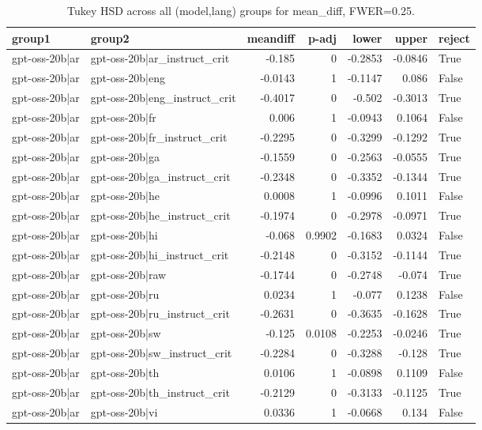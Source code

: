 \begin{table}
\caption{Tukey HSD across all (model,lang) groups for mean_diff, FWER=0.25.}
\label{tab:tukey_all_models_all_langs_mean_diff}
\begin{tabular}{l l r r r r l}
\toprule
group1 & group2 & meandiff & p-adj & lower & upper & reject \\
\midrule
gpt-oss-20b|ar & gpt-oss-20b|ar_instruct_crit & -0.185 & 0 & -0.2853 & -0.0846 & True \\
gpt-oss-20b|ar & gpt-oss-20b|eng & -0.0143 & 1 & -0.1147 & 0.086 & False \\
gpt-oss-20b|ar & gpt-oss-20b|eng_instruct_crit & -0.4017 & 0 & -0.502 & -0.3013 & True \\
gpt-oss-20b|ar & gpt-oss-20b|fr & 0.006 & 1 & -0.0943 & 0.1064 & False \\
gpt-oss-20b|ar & gpt-oss-20b|fr_instruct_crit & -0.2295 & 0 & -0.3299 & -0.1292 & True \\
gpt-oss-20b|ar & gpt-oss-20b|ga & -0.1559 & 0 & -0.2563 & -0.0555 & True \\
gpt-oss-20b|ar & gpt-oss-20b|ga_instruct_crit & -0.2348 & 0 & -0.3352 & -0.1344 & True \\
gpt-oss-20b|ar & gpt-oss-20b|he & 0.0008 & 1 & -0.0996 & 0.1011 & False \\
gpt-oss-20b|ar & gpt-oss-20b|he_instruct_crit & -0.1974 & 0 & -0.2978 & -0.0971 & True \\
gpt-oss-20b|ar & gpt-oss-20b|hi & -0.068 & 0.9902 & -0.1683 & 0.0324 & False \\
gpt-oss-20b|ar & gpt-oss-20b|hi_instruct_crit & -0.2148 & 0 & -0.3152 & -0.1144 & True \\
gpt-oss-20b|ar & gpt-oss-20b|raw & -0.1744 & 0 & -0.2748 & -0.074 & True \\
gpt-oss-20b|ar & gpt-oss-20b|ru & 0.0234 & 1 & -0.077 & 0.1238 & False \\
gpt-oss-20b|ar & gpt-oss-20b|ru_instruct_crit & -0.2631 & 0 & -0.3635 & -0.1628 & True \\
gpt-oss-20b|ar & gpt-oss-20b|sw & -0.125 & 0.0108 & -0.2253 & -0.0246 & True \\
gpt-oss-20b|ar & gpt-oss-20b|sw_instruct_crit & -0.2284 & 0 & -0.3288 & -0.128 & True \\
gpt-oss-20b|ar & gpt-oss-20b|th & 0.0106 & 1 & -0.0898 & 0.1109 & False \\
gpt-oss-20b|ar & gpt-oss-20b|th_instruct_crit & -0.2129 & 0 & -0.3133 & -0.1125 & True \\
gpt-oss-20b|ar & gpt-oss-20b|vi & 0.0336 & 1 & -0.0668 & 0.134 & False \\

\end{tabular}
\end{table}
